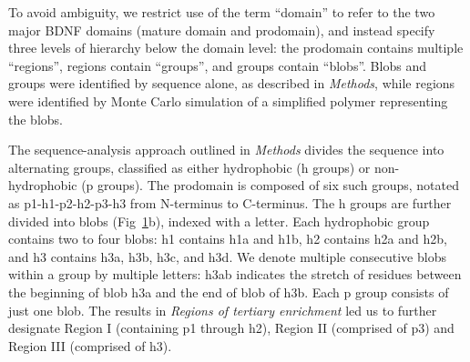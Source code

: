 \documentclass[10pt,letterpaper]{article}
\begin{document}
\begin{figure}[!ht]
\label{fig1} 
\end{figure}


To avoid ambiguity, we restrict use of the term ``domain'' to refer to the two major BDNF domains (mature domain and prodomain), and instead specify three levels of hierarchy below the domain level: the prodomain contains multiple ``regions'', regions contain ``groups'', and groups contain ``blobs''. Blobs and groups were identified by sequence alone, as described in {\it Methods}, while regions were identified by Monte Carlo simulation of a simplified polymer representing the blobs.
 
The sequence-analysis approach outlined in {\it Methods} divides the sequence into alternating groups, classified as either hydrophobic (h groups) or non-hydrophobic (p groups). The prodomain is composed of six such groups, notated as p1-h1-p2-h2-p3-h3 from N-terminus to C-terminus. The h groups are further divided into blobs (Fig~\ref{fig1}b), indexed with a letter. Each hydrophobic group contains two to four blobs: h1 contains h1a and h1b, h2 contains h2a and h2b, and h3 contains h3a, h3b, h3c, and h3d. We denote multiple consecutive blobs within a group by multiple letters: h3ab indicates the stretch of residues between the beginning of blob h3a and the end of blob of h3b. Each p group consists of just one blob. The results in {\it Regions of tertiary enrichment} led us to further designate Region I (containing p1 through h2), Region II (comprised of p3) and Region III (comprised of h3).
\end{document}
